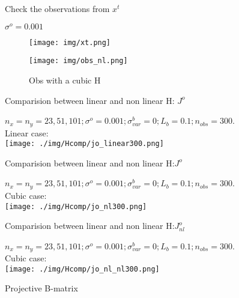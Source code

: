 \documentclass[francais]{beamer}
\begin{document}
\begin{frame}{Check the observations from $x^t$}
\begin{center}
$ \sigma^o = 0.001$\\ 
\begin{figure}
  \texttt{[image: img/xt.png]}
  \caption{$x^t$}
\endminipage\hfill
{}
  \texttt{[image: img/obs\_nl.png]}
  \caption{Obs with a cubic H}
\endminipage
\end{figure}
\end{center}
\end{frame}

\begin{frame}{Comparision between linear and non linear H: $J^o$}
\begin{center}
$n_x=n_y=23,51,101 ; \sigma^o = 0.001 ; \sigma^b_{var} = 0 ; L_b = 0.1 ; n_{obs}=300$.\\
Linear case:\\
\texttt{[image: ./img/Hcomp/jo\_linear300.png]}
\end{center}
\end{frame}

\begin{frame}{Comparision between linear and non linear H:$J^o$}
\begin{center}
$n_x=n_y=23,51,101 ; \sigma^o = 0.001 ; \sigma^b_{var} = 0 ; L_b = 0.1 ; n_{obs}=300$.\\
Cubic case:\\
\texttt{[image: ./img/Hcomp/jo\_nl300.png]}
\end{center}
\end{frame}

\begin{frame}{Comparision between linear and non linear H:$J^o_{nl}$}
\begin{center}
$n_x=n_y=23,51,101 ; \sigma^o = 0.001 ; \sigma^b_{var} = 0 ; L_b = 0.1 ; n_{obs}=300$.\\
Cubic case:\\
\texttt{[image: ./img/Hcomp/jo\_nl\_nl300.png]}
\end{center}
\end{frame}


\begin{frame}
\begin{center}
\huge{Projective B-matrix}
\end{center}
\end{frame}
\end{document}
